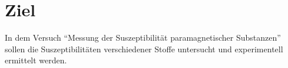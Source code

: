 \section{Ziel}
\label{sec:Ziel}

In dem Versuch \enquote{Messung der Suszeptibilität paramagnetischer Substanzen} sollen
die Suszeptibilitäten verschiedener Stoffe untersucht und experimentell ermittelt werden.